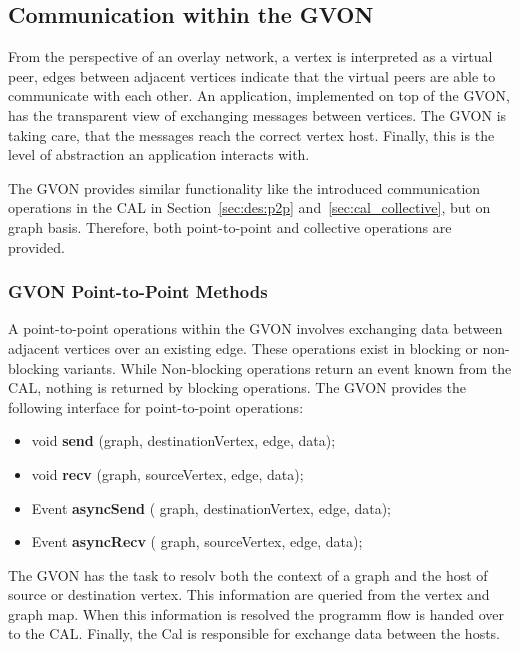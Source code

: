 \subsection{Communication within the GVON}
From the perspective of an overlay network, a vertex is interpreted as
a virtual peer, edges between adjacent vertices indicate that the
virtual peers are able to communicate with each other. An application,
implemented on top of the GVON, has the transparent view of exchanging
messages between vertices. The GVON is taking care, that the messages
reach the correct vertex host.  Finally, this is the level of
abstraction an application interacts with.

The GVON provides similar functionality like the introduced
communication operations in the CAL in Section~\ref{sec:des:p2p}
and~\ref{sec:cal_collective}, but on graph basis. Therefore, both
point-to-point and collective operations are provided.

\subsubsection*{GVON Point-to-Point Methods}
A point-to-point operations within the GVON involves exchanging data
between adjacent vertices over an existing edge.  These operations
exist in blocking or non-blocking variants. While Non-blocking
operations return an event known from the CAL, nothing is returned by
blocking operations. The GVON provides the following interface for
point-to-point operations:

\begin{itemize}
  \item  void \textbf{send} (graph, destinationVertex, edge, data);
  \item  void \textbf{recv} (graph, sourceVertex, edge, data);
  \item  Event \textbf{asyncSend} ( graph, destinationVertex, edge, data);
  \item  Event \textbf{asyncRecv} ( graph, sourceVertex, edge, data);
\end{itemize}

\noindent The GVON has the task to resolv both the context of a graph
and the host of source or destination vertex. This information are
queried from the vertex and graph map. When this information is
resolved the programm flow is handed over to the CAL. Finally, the Cal
is responsible for exchange data between the hosts.

